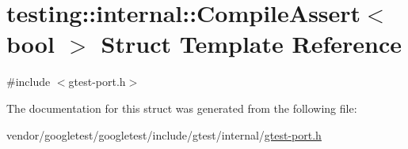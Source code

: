\hypertarget{structtesting_1_1internal_1_1CompileAssert}{}\section{testing\+:\+:internal\+:\+:Compile\+Assert$<$ bool $>$ Struct Template Reference}
\label{structtesting_1_1internal_1_1CompileAssert}


{\ttfamily \#include $<$gtest-\/port.\+h$>$}



The documentation for this struct was generated from the following file\+:\begin{DoxyCompactItemize}
\item 
vendor/googletest/googletest/include/gtest/internal/\hyperlink{gtest-port_8h}{gtest-\/port.\+h}\end{DoxyCompactItemize}
